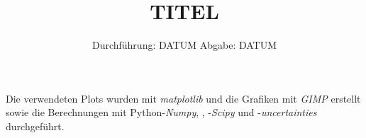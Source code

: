 
\subject{VERSUCH NUMMER}
\title{TITEL}
\date{
  Durchführung: DATUM
  \hspace{3em}
  Abgabe: DATUM
}


\maketitle
\thispagestyle{empty}
\newpage








\printbibliography
\noindent Die verwendeten Plots wurden mit \textit{matplotlib}\cite{matplotlib} und die Grafiken mit \textit{GIMP}\cite{gimp} erstellt sowie die Berechnungen mit Python-\textit{Numpy}, \cite{numpy}, -\textit{Scipy}\cite{scipy} und -\textit{uncertainties}\cite{uncertainties} durchgeführt.

